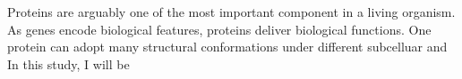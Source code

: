 Proteins are arguably one of the most important component in a living organism. As genes encode biological features, proteins deliver biological functions. One protein can adopt many structural conformations under different subcelluar and   In this study, I will be 